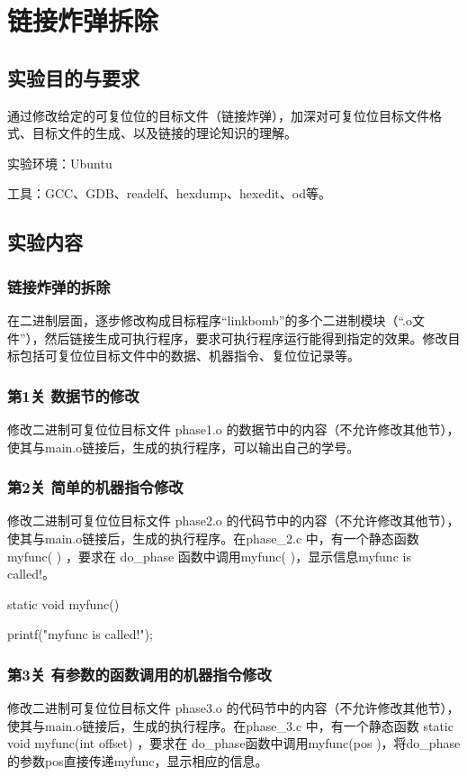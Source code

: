 \documentclass[supercite]{Experimental_Report}
\theoremstyle{definition}
\begin{document}
	\section{链接炸弹拆除}
	\subsection{实验目的与要求}
	通过修改给定的可复位位的目标文件（链接炸弹），加深对可复位位目标文件格式、目标文件的生成、以及链接的理论知识的理解。
	
	实验环境：Ubuntu
	
	工具：GCC、GDB、readelf、hexdump、hexedit、od等。
	
	
	\subsection{实验内容}
	\subsubsection{链接炸弹的拆除}
	在二进制层面，逐步修改构成目标程序“linkbomb”的多个二进制模块（“.o文件”），然后链接生成可执行程序，要求可执行程序运行能得到指定的效果。修改目标包括可复位位目标文件中的数据、机器指令、复位位记录等。
	\subsubsection{第1关 数据节的修改}
	修改二进制可复位位目标文件 phase1.o 的数据节中的内容（不允许修改其他节），使其与main.o链接后，生成的执行程序，可以输出自己的学号。
	\subsubsection{第2关 简单的机器指令修改}
	修改二进制可复位位目标文件 phase2.o 的代码节中的内容（不允许修改其他节），使其与main.o链接后，生成的执行程序。在phase\_2.c 中，有一个静态函数 myfunc( ) ，要求在 do\_phase 函数中调用myfunc( )，显示信息myfunc is called!。
	
	static void myfunc()
	
	{	printf("myfunc is called!\n");   }
	
	\subsubsection{第3关 有参数的函数调用的机器指令修改}
	修改二进制可复位位目标文件 phase3.o 的代码节中的内容（不允许修改其他节），使其与main.o链接后，生成的执行程序。在phase\_3.c 中，有一个静态函数 static void myfunc(int offset) ，要求在 do\_phase函数中调用myfunc(pos )，将do\_phase的参数pos直接传递myfunc，显示相应的信息。
\end{document}
